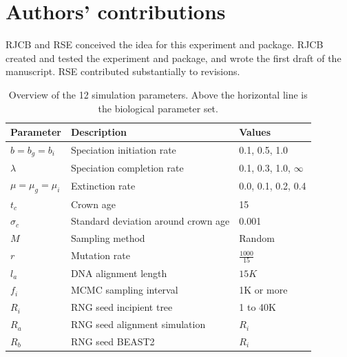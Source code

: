 \documentclass{article}
\begin{document}
\section{Authors' contributions}

RJCB and RSE conceived the idea for this experiment and package. 
RJCB created and tested the experiment and package, 
and wrote the first draft of the manuscript. 
RSE contributed substantially to revisions.




\appendix

\begin{table}
  \centering 
  \begin{tabular}{l l l}
    \hline
    Parameter             & Description & Values \\
    \hline
    \hline
    $b = b_g = b_i$       & Speciation initiation rate & 0.1, 0.5, 1.0 \\
    $\lambda$             & Speciation completion rate & 0.1, 0.3, 1.0, $\infty$ \\
    $\mu = \mu_g = \mu_i$ & Extinction rate & 0.0, 0.1, 0.2, 0.4 \\
    \hline
    $t_c$                 & Crown age & 15 \\
    $\sigma_c$            & Standard deviation around crown age & 0.001 \\
    $M$                   & Sampling method & Random \\
    $r$                   & Mutation rate & $\frac{1000}{15}$ \\
    $l_a$                 & DNA alignment length & $15K$ \\
    $f_i$                 & MCMC sampling interval & 1K or more \\
    $R_i$                 & RNG seed incipient tree & 1 to 40K \\
    $R_a$                 & RNG seed alignment simulation & $R_i$ \\
    $R_b$                 & RNG seed BEAST2 & $R_i$ \\
    \hline
  \end{tabular}
  \caption{
    Overview of the 12 simulation parameters. Above the horizontal line is 
    the biological parameter set.
  }
  \label{table:parameters}
\end{table}
\end{document}
